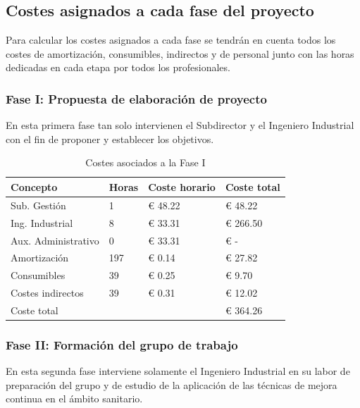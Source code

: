 \subsection{Costes asignados a cada fase del proyecto}

Para calcular los costes asignados a cada fase se tendrán en cuenta todos los costes de amortización, consumibles, indirectos y de personal junto con las horas dedicadas en cada etapa por todos los profesionales.

\subsubsection{Fase I: Propuesta de elaboración de proyecto}

En esta primera fase tan solo intervienen el Subdirector y el Ingeniero Industrial con el fin de proponer y establecer los objetivos.

\begin{table}[H]
    \centering
    \begin{tabular}{@{}llll@{}}
        \toprule
        Concepto            & Horas & Coste horario & Coste total \\ \midrule
        Sub. Gestión        & 1     & € 48.22       & € 48.22     \\
        Ing. Industrial     & 8     & € 33.31       & € 266.50    \\
        Aux. Administrativo & 0     & € 33.31       & € -         \\
        Amortización        & 197   & € 0.14        & € 27.82     \\
        Consumibles         & 39    & € 0.25        & € 9.70      \\
        Costes indirectos   & 39    & € 0.31        & € 12.02     \\
        \midrule
        Coste total         &       &               & € 364.26    \\
        \bottomrule
    \end{tabular}
    \caption{Costes asociados a la Fase I}
    \label{tab:fase-propuesta}
\end{table}

\subsubsection{Fase II: Formación del grupo de trabajo}

En esta segunda fase interviene solamente el Ingeniero Industrial en su labor de preparación del grupo y de estudio de la aplicación de las técnicas de mejora continua en el ámbito sanitario.

